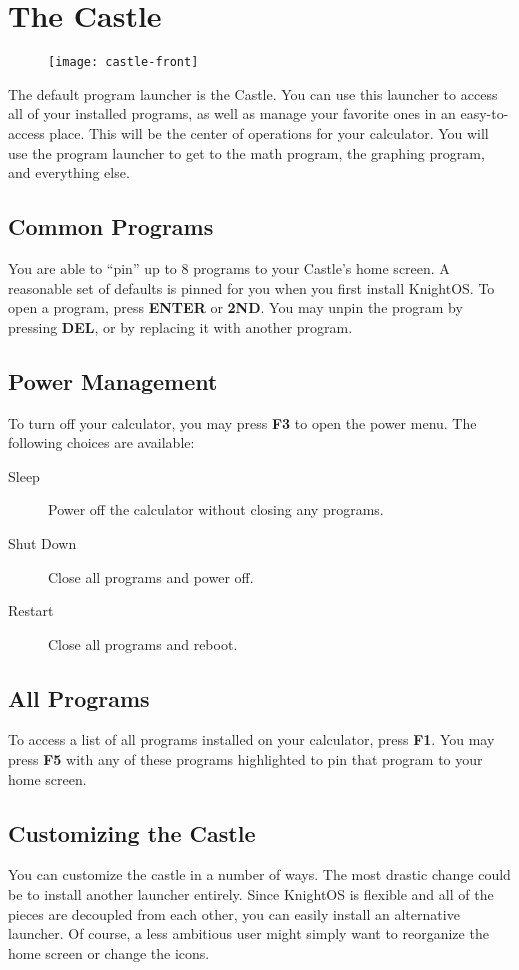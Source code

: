 \chapter{The Castle}

\begin{figure}[ht!]
    \centering
    \texttt{[image: castle-front]}
\end{figure}

The default program launcher is the Castle. You can use this launcher to access
all of your installed programs, as well as manage your favorite ones in an
easy-to-access place. This will be the center of operations for your calculator.
You will use the program launcher to get to the math program, the graphing
program, and everything else.

\section{Common Programs}

You are able to ``pin'' up to 8 programs to your Castle's home screen. A
reasonable set of defaults is pinned for you when you first install KnightOS. To
open a program, press \textbf{ENTER} or \textbf{2ND}. You may unpin the program by
pressing \textbf{DEL}, or by replacing it with another program.

\section{Power Management}

To turn off your calculator, you may press \textbf{F3} to open the power menu.
The following choices are available:

\begin{description}
    \item[Sleep] Power off the calculator without closing any programs.
    \item[Shut Down] Close all programs and power off.
    \item[Restart] Close all programs and reboot.
\end{description}

\section{All Programs}

To access a list of all programs installed on your calculator, press \textbf{F1}.
You may press \textbf{F5} with any of these programs highlighted to pin that
program to your home screen.

\section{Customizing the Castle}

You can customize the castle in a number of ways. The most drastic change could be
to install another launcher entirely. Since KnightOS is flexible and all of the
pieces are decoupled from each other, you can easily install an alternative
launcher. Of course, a less ambitious user might simply want to reorganize the
home screen or change the icons.
